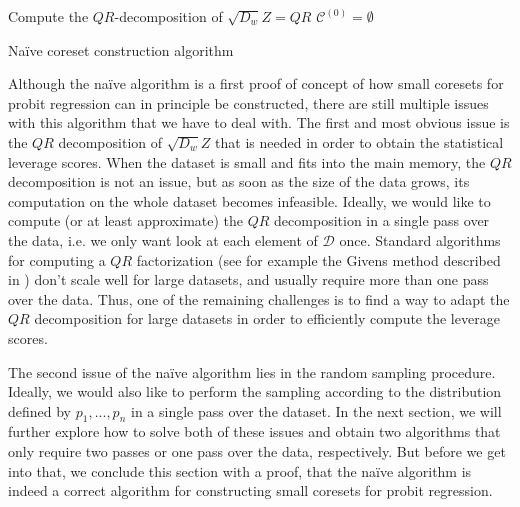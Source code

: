 \begin{algorithm}
    \DontPrintSemicolon
    Compute the $QR$-decomposition of $\sqrt{D_w}Z = QR$ \;
    $\mathcal{C}^{(0)} = \emptyset$ \;
    \caption{Na\"ive coreset construction algorithm\label{algo:naive}}
\end{algorithm}

Although the na\"ive algorithm is a first proof of concept of how small coresets
for probit regression can in principle be constructed,
there are still multiple issues with this algorithm that
we have to deal with.
The first and most obvious issue is the $QR$ decomposition of
$\sqrt{D_w}Z$ that is needed in order to obtain
the statistical leverage scores.
When the dataset is small and fits into the main
memory, the $QR$ decomposition is not an issue, but as soon as
the size of the data grows, its computation on the whole dataset
becomes infeasible. Ideally, we would like to compute
(or at least approximate) the $QR$ decomposition in a single
pass over the data, i.e. we only want look at each element
of $\mathcal{D}$ once.
Standard algorithms for computing a $QR$ factorization
(see for example the Givens method described in
\cite{matrix-computations}) don't scale well for large datasets,
and usually require more than one pass over the data.
Thus, one of the remaining challenges is to find a way to
adapt the $QR$ decomposition for large datasets in order
to efficiently compute the leverage scores.

The second issue of the na\"ive algorithm lies in the
random sampling procedure. Ideally, we would also like to
perform the sampling according to the distribution defined
by $p_1, ..., p_n$ in a single pass over the dataset.
In the next section, we will further explore how to solve
both of these issues and obtain two algorithms that only require
two passes or one pass over the data, respectively.
But before we get into that, we conclude this section with a
proof, that the na\"ive algorithm is indeed a correct algorithm
for constructing small coresets for probit regression.

